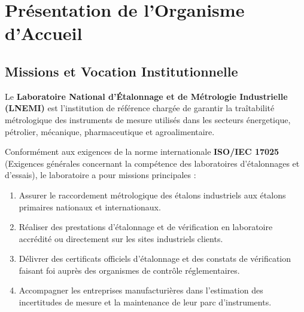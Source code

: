 \documentclass{bts-report}
\begin{document}
\section{Pr\'esentation de l'Organisme d'Accueil}
\subsection{Missions et Vocation Institutionnelle}
Le \textbf{Laboratoire National d'\'Etalonnage et de M\'etrologie Industrielle (LNEMI)} est l'institution de r\'ef\'erence charg\'ee de garantir la tra\^itabilit\'e m\'etrologique des instruments de mesure utilis\'es dans les secteurs \'energetique, p\'etrolier, m\'ecanique, pharmaceutique et agroalimentaire.

Conform\'ement aux exigences de la norme internationale \textbf{ISO/IEC 17025} (Exigences g\'en\'erales concernant la comp\'etence des laboratoires d'\'etalonnages et d'essais), le laboratoire a pour missions principales :
\begin{enumerate}
  \item Assurer le raccordement m\'etrologique des \'etalons industriels aux \'etalons primaires nationaux et internationaux.
  \item R\'ealiser des prestations d'\'etalonnage et de v\'erification en laboratoire accr\'edit\'e ou directement sur les sites industriels clients.
  \item D\'elivrer des certificats officiels d'\'etalonnage et des constats de v\'erification faisant foi aupr\`es des organismes de contr\^ole r\'eglementaires.
  \item Accompagner les entreprises manufacturi\`eres dans l'estimation des incertitudes de mesure et la maintenance de leur parc d'instruments.
\end{enumerate}
\end{document}
